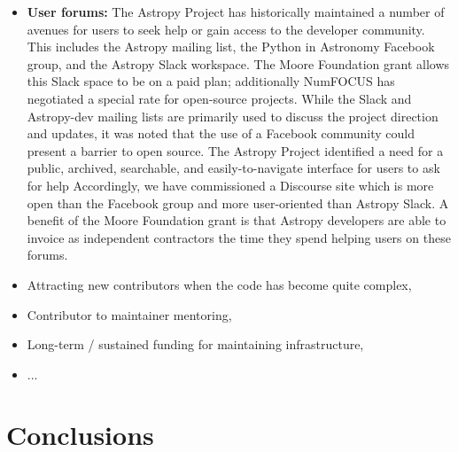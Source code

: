 \documentclass[modern]{aastex631}
\begin{document}
\begin{itemize}
\item {\bf User forums:} The Astropy Project has historically maintained a number of avenues for users to seek help or gain access to the developer community. This includes the Astropy mailing list, the Python in Astronomy Facebook group, and the Astropy Slack workspace. The Moore Foundation grant allows this Slack space to
be on a paid plan; additionally NumFOCUS has negotiated a special rate for
open-source projects. While the Slack and Astropy-dev mailing lists are primarily used to discuss the project direction and updates, it was noted that the use of a Facebook community could present a barrier to open source. The Astropy Project identified a need for a public, archived, searchable, and easily-to-navigate interface for users to ask for help Accordingly, we have commissioned
a Discourse site which is more open than the Facebook group and more user-oriented
than Astropy Slack. A benefit of the Moore Foundation grant is that Astropy
developers are able to invoice as independent contractors the time they
spend helping users on these forums.
\end{itemize}

\begin{itemize}
\item Attracting new contributors when the code has become quite complex,
\item Contributor to maintainer mentoring,
\item Long-term / sustained funding for maintaining infrastructure,
\item ...
\end{itemize}


\section{Conclusions}
\label{sec:conclusions}
\end{document}
